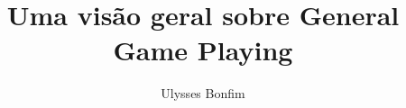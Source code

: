 \documentclass[a4paper]{sbgames}               %
\title{Uma visão geral sobre General Game Playing}
\author{Ulysses Bonfim}
\affiliation{Universidade Federal do Paraná}
\begin{document}


\maketitle



\keywordlist
\contactlist









\end{document}
